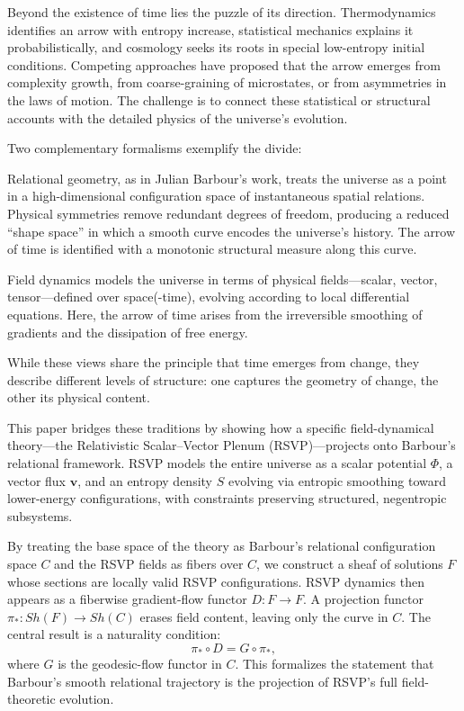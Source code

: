 \documentclass[11pt]{article}
\theoremstyle{plain}
\theoremstyle{definition}
\begin{document}
Beyond the existence of time lies the puzzle of its direction. Thermodynamics identifies an arrow with entropy increase, statistical mechanics explains it probabilistically, and cosmology seeks its roots in special low-entropy initial conditions. Competing approaches have proposed that the arrow emerges from complexity growth, from coarse-graining of microstates, or from asymmetries in the laws of motion. The challenge is to connect these statistical or structural accounts with the detailed physics of the universe’s evolution.

Two complementary formalisms exemplify the divide:

Relational geometry, as in Julian Barbour’s work, treats the universe as a point in a high-dimensional configuration space of instantaneous spatial relations. Physical symmetries remove redundant degrees of freedom, producing a reduced “shape space” in which a smooth curve encodes the universe’s history. The arrow of time is identified with a monotonic structural measure along this curve.

Field dynamics models the universe in terms of physical fields—scalar, vector, tensor—defined over space(-time), evolving according to local differential equations. Here, the arrow of time arises from the irreversible smoothing of gradients and the dissipation of free energy.

While these views share the principle that time emerges from change, they describe different levels of structure: one captures the geometry of change, the other its physical content.

This paper bridges these traditions by showing how a specific field-dynamical theory—the Relativistic Scalar–Vector Plenum (RSVP)—projects onto Barbour’s relational framework. RSVP models the entire universe as a scalar potential $\Phi$, a vector flux $\mathbf{v}$, and an entropy density $S$ evolving via entropic smoothing toward lower-energy configurations, with constraints preserving structured, negentropic subsystems.

By treating the base space of the theory as Barbour’s relational configuration space $C$ and the RSVP fields as fibers over $C$, we construct a sheaf of solutions $F$ whose sections are locally valid RSVP configurations. RSVP dynamics then appears as a fiberwise gradient-flow functor $D: F \to F$. A projection functor $\pi_*: Sh(F) \to Sh(C)$ erases field content, leaving only the curve in $C$. The central result is a naturality condition:
\[
\pi_* \circ D = G \circ \pi_*,
\]
where $G$ is the geodesic-flow functor in $C$. This formalizes the statement that Barbour’s smooth relational trajectory is the projection of RSVP’s full field-theoretic evolution.
\end{document}
